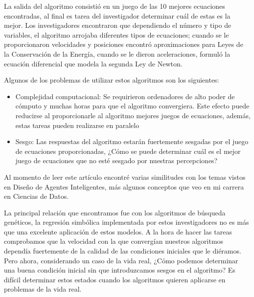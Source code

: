 \documentclass{article}
\begin{document}
        La salida del algoritmo consistió en un juego de las 10 mejores ecuaciones encontradas, al final es tarea del investigador determinar cuál de estas es la mejor. Los investigadores encontraron que dependiendo el número y tipo de variables, el algoritmo arrojaba diferentes tipos de ecuaciones; cuando se le proporcionaron velocidades y posiciones encontró aproximaciones para Leyes de la Conservación de la Energía, cuando se le dieron aceleraciones, formuló la ecuación diferencial que modela la segunda Ley de Newton.

        Algunos de los problemas de utilizar estos algoritmos son los siguientes:
        \begin{itemize}
            \item Complejidad computacional: Se requirieron ordenadores de alto poder de cómputo y muchas horas para que el algoritmo convergiera. Este efecto puede reducirse al proporcionarle al algoritmo mejores juegos de ecuaciones, además, estas tareas pueden realizarse en paralelo
            \item Sesgo: Las respuestas del algoritmo estarán fuertemente sesgadas por el juego de ecuaciones proporcionadas, ¿Cómo se puede determinar cuál es el mejor juego de ecuaciones que no esté sesgado por nuestras percepciones?
        \end{itemize}

        Al momento de leer este artículo encontré varias similitudes con los temas vistos en Diseño de Agentes Inteligentes, más algunos conceptos que veo en mi carrera en Ciencias de Datos.
        
        La principal relación que encontramos fue con los algoritmos de búsqueda genéticos, la regresión simbólica implementada por estos investigadores no es más que una excelente aplicación de estos modelos. A la hora de hacer las tareas comprobamos que la velocidad con la que convergían nuestros algoritmos dependía fuertemente de la calidad de las condiciones iniciales que le diéramos. Pero ahora, considerando un caso de la vida real, ¿Cómo podemos determinar una buena condición inicial sin que introduzcamos sesgos en el algoritmo? Es difícil determinar estos estados cuando los algoritmos quieren aplicarse en problemas de la vida real. 

    \clearpage
    \nocite{*}
    \printbibliography
\end{document}
